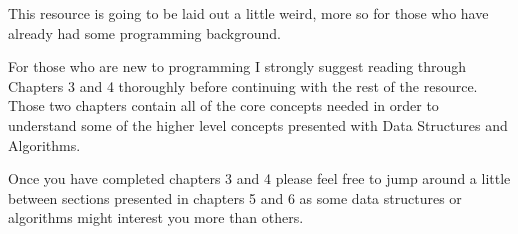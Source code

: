This resource is going to be laid out a little weird, more so for those who have already had some programming background.
\par

For those who are new to programming I strongly suggest reading through Chapters 3 and 4 thoroughly before continuing with the
rest of the resource. Those two chapters contain all of the core concepts needed in order to understand some of the higher level
concepts presented with Data Structures and Algorithms.
\par

Once you have completed chapters 3 and 4 please feel free to jump around a little between sections presented in chapters 5 and 6 as
some data structures or algorithms might interest you more than others.
